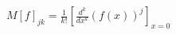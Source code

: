 \documentclass[preview]{standalone}
\begin{document}
\begin{align*}
M[f]_{jk} = \frac{1}{k!}[\frac{d^k}{dx^k}(f(x))^j]_{x=0}
\end{align*}
\end{document}

